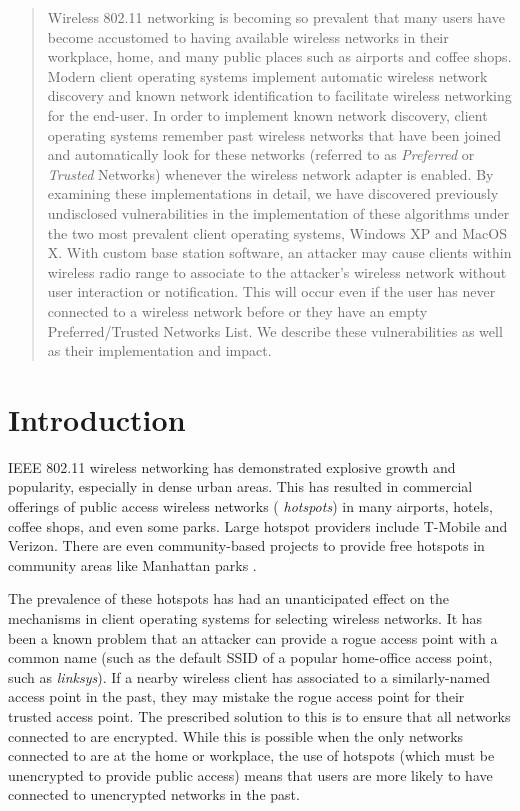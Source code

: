 \documentclass[10pt,twocolumn]{article}
\begin{document}
\begin{abstract}

  Wireless 802.11 networking is becoming so prevalent that many users
  have become accustomed to having available wireless networks in
  their workplace, home, and many public places such as airports and
  coffee shops.  Modern client operating systems implement automatic
  wireless network discovery and known network identification to
  facilitate wireless networking for the end-user.  In order to
  implement known network discovery, client operating systems remember
  past wireless networks that have been joined and automatically look
  for these networks (referred to as {\it Preferred} or {\it Trusted}
  Networks) whenever the wireless network adapter is enabled.  By
  examining these implementations in detail, we have discovered
  previously undisclosed vulnerabilities in the implementation of
  these algorithms under the two most prevalent client operating
  systems, Windows XP and MacOS X.  With custom base station software,
  an attacker may cause clients within wireless radio range to
  associate to the attacker's wireless network without user
  interaction or notification.  This will occur even if the user has
  never connected to a wireless network before or they have an empty
  Preferred/Trusted Networks List.  We describe these vulnerabilities
  as well as their implementation and impact.
  
\end{abstract}


\section{Introduction}

IEEE 802.11 wireless networking has demonstrated explosive growth and
popularity, especially in dense urban areas.  This has resulted in
commercial offerings of public access wireless networks ({\it
  hotspots}) in many airports, hotels, coffee shops, and even some
parks.  Large hotspot providers include T-Mobile and Verizon.  There
are even community-based projects to provide free hotspots in
community areas like Manhattan parks \cite{nycwireless}.

The prevalence of these hotspots has had an unanticipated effect on
the mechanisms in client operating systems for selecting wireless
networks.  It has been a known problem that an attacker can provide a
rogue access point with a common name (such as the default SSID of a
popular home-office access point, such as {\it linksys}).  If a nearby
wireless client has associated to a similarly-named access point in
the past, they may mistake the rogue access point for their trusted
access point.  The prescribed solution to this is to ensure that all
networks connected to are encrypted.  While this is possible when the
only networks connected to are at the home or workplace, the use of
hotspots (which must be unencrypted to provide public access) means
that users are more likely to have connected to unencrypted networks
in the past.
\end{document}
